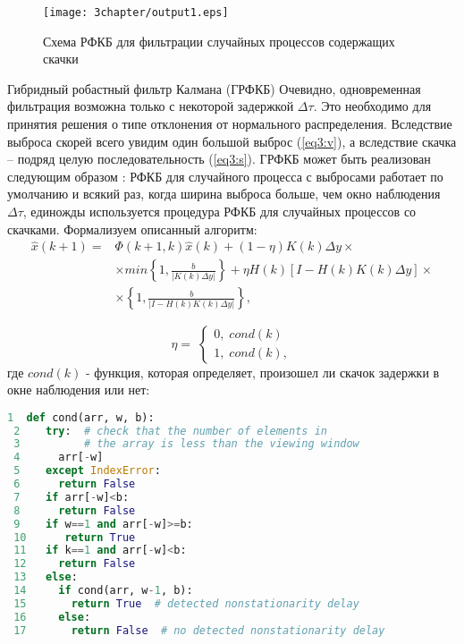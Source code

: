 \begin{figure} [h]
  \center
\texttt{[image: 3chapter/output1.eps]}
  \caption{Схема РФКБ для фильтрации случайных процессов содержащих скачки}
  \label{img3:kalmanS}
\end{figure}

Гибридный робастный фильтр Калмана (ГРФКБ)
Очевидно, одновременная фильтрация возможна только с некоторой задержкой $\Delta \tau$. 
Это необходимо для принятия решения о типе отклонения от нормального распределения. 
Вследствие выброса скорей всего увидим один большой выброс (\ref{eq3:v}), а вследствие скачка – подряд целую последовательность (\ref{eq3:s}). 
ГРФКБ может быть реализован следующим образом \cite{RobustFilter}: РФКБ для случайного процесса с выбросами работает по умолчанию и всякий раз, когда ширина выброса больше, чем окно наблюдения $\Delta \tau$, единожды используется процедура РФКБ для случайных процессов со скачками.
Формализуем описанный алгоритм:
\begin{equation}\label{eq3:syntes1}
\begin{split}
\hat{x}(k+1)=&\Phi(k+1,k)\hat{x}(k)+(1-\eta)K(k)\Delta y\times \\
&\times min\left\{1,\frac{b}{|K(k)\Delta y|}\right\}+\eta H(k)[I-H(k)K(k)\Delta y] \times\\
&\times\left\{1,\frac{b}{|I-H(k)K(k)\Delta y|}\right\},
\end{split}
\end{equation}

\begin{equation}\label{eq3:syntes2}
\eta= \;
\begin{cases}
0, \; cond(k) \\    
1, \; cond(k),    
\end{cases}
\end{equation}
\noindent где $cond(k)$ - функция, которая определяет, произошел ли скачок задержки в окне наблюдения или нет:
\begin{lstlisting}[language=Python]
 1  def cond(arr, w, b):  
 2    try:  # check that the number of elements in
 3          # the array is less than the viewing window
 4      arr[-w] 
 5    except IndexError:
 6      return False
 7    if arr[-w]<b:
 8      return False
 9    if w==1 and arr[-w]>=b:
 10      return True
 11   if k==1 and arr[-w]<b:
 12     return False
 13   else:
 14     if cond(arr, w-1, b):
 15       return True  # detected nonstationarity delay
 16     else:
 17       return False  # no detected nonstationarity delay
\end{lstlisting}


